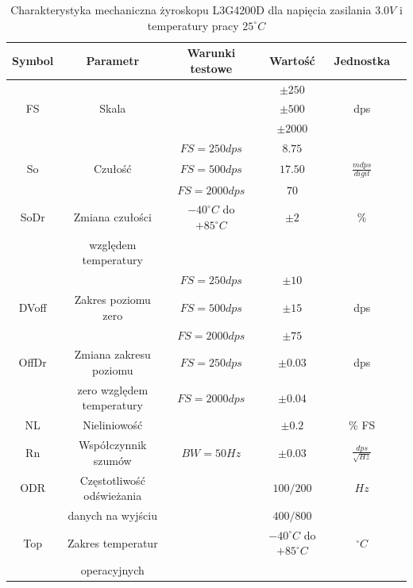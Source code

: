 \begin{table}[hb]
\centering
\caption{Charakterystyka mechaniczna żyroskopu L3G4200D dla napięcia zasilania $3.0V$ i temperatury pracy $25^{\circ}C$}
   	\begin{tabular}{ | c | c | c | c | c | p{1.75cm} |} \hline
   		Symbol & Parametr & Warunki testowe & Wartość & Jednostka \\ \hline
   		& & & $\pm 250$ & \\
   		FS & Skala & & $\pm 500$ & dps\\
   		& & & $\pm 2000$ & \\ \hline
   		& & $FS = 250 dps$  & $8.75$  & \\
   		So  & Czułość & $FS = 500 dps$ & $17.50$  & $\frac{mdps}{digit}$ \\
   		& & $FS = 2000 dps$  & $70$  & \\ \hline
   		SoDr & Zmiana czułości & $-40^{\circ}C$ do $+85^{\circ}C$ & $\pm 2$  & \% \\
		& względem temperatury & & &  \\ \hline
		& & $FS = 250 dps$ & $\pm 10$  &  \\
   		DVoff & Zakres poziomu zero & $FS = 500 dps$  & $\pm 15$ & dps \\
   		& & $FS = 2000 dps$ & $\pm 75$ & \\ \hline
   		OffDr & Zmiana zakresu poziomu & $FS = 250 dps$  & $\pm 0.03$ & dps \\
   		& zero względem temperatury & $FS = 2000 dps$ & $\pm 0.04$ & \\ \hline
		NL & Nieliniowość & & $\pm 0.2$ & \% FS \\ \hline
		Rn & Współczynnik szumów & $BW = 50 Hz$ & $\pm 0.03$ & $\frac{dps}{\sqrt{Hz}}$ \\ \hline
		ODR & Częstotliwość odświeżania & & $100/200$ & $Hz$ \\
		& danych na wyjściu & & $400/800$ & \\ \hline
		Top & Zakres temperatur & & $-40^{\circ} C$ do $+85^{\circ} C$ & $^{\circ} C$ \\
		& operacyjnych & & & \\ \hline
   	\end{tabular}
\label{tab:L3G4200DMechChar}
\end{table}

